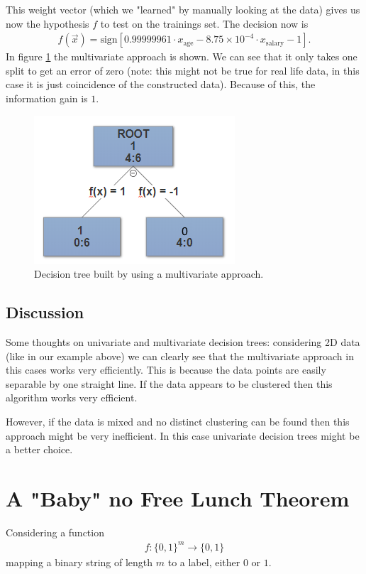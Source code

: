 \documentclass[12pt]{article}
\begin{document}
This weight vector (which we "learned" by manually looking at the data) gives us now the hypothesis $f$ to test on the trainings set. The decision now is
\begin{align}
f(\vec{x})=\text{sign}\left[0.99999961\cdot x_\text{age}-8.75\times 10^{-4}\cdot x_\text{salary}-1\right].
\end{align}
In figure \ref{fig:multi} the multivariate approach is shown. We can see that it only takes one split to get an error of zero (note: this might not be true for real life data, in this case it is just coincidence of the constructed data). Because of this, the information gain is $1$.  

\begin{figure}[h]
	\centering
	\includegraphics[width=0.35\linewidth]{../Problem_2/Figure_2.3.png}
	\caption{Decision tree built by using a multivariate approach.}
	\label{fig:multi}
\end{figure}

\subsection{Discussion}

Some thoughts on univariate and multivariate decision trees: considering 2D data (like in our example above) we can clearly see that the multivariate approach in this cases works very efficiently. This is because the data points are easily separable by one straight line. If the data appears to be clustered then this algorithm works very efficient. \par 
However, if the data is mixed and no distinct clustering can be found then this approach might be very inefficient. In this case univariate decision trees might be a better choice.   

\section{A "Baby" no Free Lunch Theorem}

Considering a function
\begin{align}
f:\{0,1\}^m\rightarrow \{0,1\}
\end{align}
mapping a binary string of length $m$ to a label, either $0$ or $1$. 
\end{document}
